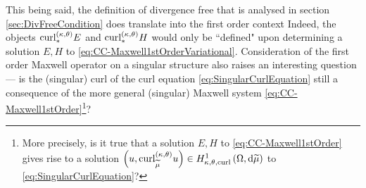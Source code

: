 This being said, the definition of divergence free that is analysed in section \ref{sec:DivFreeCondition} does translate into the first order context
Indeed, the objects $\mathrm{curl}_{*}^{\left( \kappa, \theta \right)}E$ and $\mathrm{curl}_{*}^{\left( \kappa, \theta \right)}H$ would only be ``defined" upon determining a solution $E,H$ to \eqref{eq:CC-Maxwell1stOrderVariational}.
Consideration of the first order Maxwell operator on a singular structure also raises an interesting question --- is the (singular) curl of the curl equation \eqref{eq:SingularCurlEquation} still a consequence of the more general (singular) Maxwell system \eqref{eq:CC-Maxwell1stOrder}\footnote{More precisely, is it true that a solution $E,H$ to \eqref{eq:CC-Maxwell1stOrder} gives rise to a solution $\left( u, \mathrm{curl}_{\widetilde{\mu}}^{\left( \kappa, \theta \right)}u  \right)\in H^1_{\kappa,\theta,\mathrm{curl}}\left( \Omega, \mathrm{d}\widetilde{\mu} \right)$ to \eqref{eq:SingularCurlEquation}?}?
